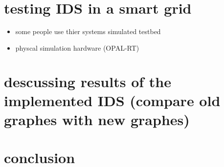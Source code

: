 \section{testing IDS in a smart grid}

\begin{itemize}
	\item some people use thier systems simulated testbed
	\item physcal simulation hardware (OPAL-RT)
\end{itemize}



\section{descussing results of the implemented IDS (compare old graphes with new graphes)}


\section{conclusion}

